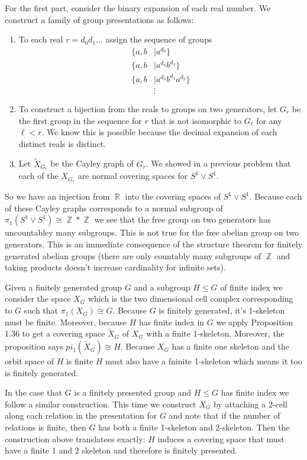 \documentclass{article}
\DeclareMathOperator{\Z}{\mathbb{Z}}
\DeclareMathOperator{\R}{\mathbb{R}}
\newcommand{\exercise}[1]{\noindent{\textbf{Exercise #1:}}}
\begin{document}
For the first part, consider the binary expansion of each real
number. We construct a family of group presentations as follows:
\begin{enumerate}
\item To each real $r = d_0d_1\ldots$ assign the sequence of groups
  \begin{align*}
    \lbrace a,b &\mid a^{d_0}\rbrace \\
    \lbrace a,b &\mid a^{d_0}b^{d_1}\rbrace \\
    \lbrace a,b &\mid a^{d_0}b^{d_1}a^{d_2}\rbrace \\
    &\vdots
  \end{align*}
\item To construct a bijection from the reals to groups on two
  generators, let $G_r$ be the first group in the sequence for $r$
  that is not isomorphic to $G_\ell$ for any $\ell < r$. We know this
  is possible because the decimal expansion of each distinct reals is
  distinct.
\item Let $\tilde{X}_{G_r}$ be the Cayley graph of $G_r$. We showed in
  a previous problem that each of the $X_{G_r}$ are normal covering
  spaces for $S^1 \vee S^1$.
\end{enumerate}
So we have an injection from $\R$ into the covering spaces of $S^1
\vee S^1$. Because each of these Cayley graphs corresponds to a normal
subgroup of $\pi_1(S^1 \vee S^1) \cong \Z \ast \Z$ we see that the
free group on two generators has uncountabley many subgroups. This is
not true for the free abelian group on two generators. This is an
immediate consequence of the structure theorem for finitely generated
abelian groups (there are only countably many subgroups of $\Z$ and
taking products doesn't increase cardinality for infinite sets).

\exercise{A3}

Given a finitely generated group $G$ and a subgroup $H \leq G$ of
finite index we consider the space $X_G$ which is the two dimensional
cell complex corresponding to $G$ such that $\pi_1(X_G) \cong
G$. Because $G$ is finitely generated, it's 1-skeleton must be
finite. Moreover, because $H$ has finite index in $G$ we apply
Proposition 1.36 to get a covering space $\tilde{X}_G$ of $X_G$ with a
finite 1-skeleton. Moreover, the proposition says $pi_1(\tilde{X}_G)
\cong H$. Because $X_G$ has a finite one skeleton and the orbit space
of $H$ is finite $H$ must also have a fninite 1-skeleton which means
it too is finitely generated.

In the case that $G$ is a finitely presented group and $H \leq G$ has
finite index we follow a similar construction. This time we construct
$X_G$ by attaching a 2-cell along each relation in the presentation
for $G$ and note that if the number of relations is finite, then $G$
has both a finite 1-skeleton and 2-skeleton. Then the construction
above translatees exactly: $H$ induces a covering space that must have
a finite 1 and 2 skeleton and therefore is finitely presented.
\end{document}
